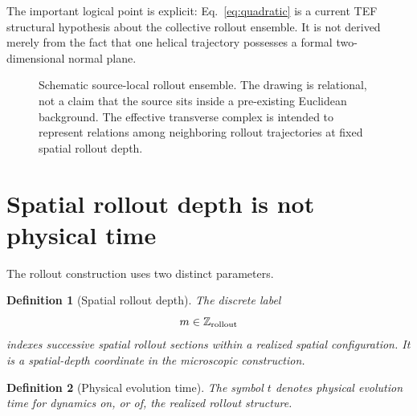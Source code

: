 \documentclass[11pt]{article}
\newtheorem{definition}{Definition}
\newcommand{\Z}{\mathbb{Z}}
\begin{document}
The important logical point is explicit: Eq.~\eqref{eq:quadratic} is a current TEF structural hypothesis about the collective rollout ensemble. It is not derived merely from the fact that one helical trajectory possesses a formal two-dimensional normal plane.

\begin{figure}[t]
\centering
{}
\caption{Schematic source-local rollout ensemble. The drawing is relational, not a claim that the source sits inside a pre-existing Euclidean background. The effective transverse complex is intended to represent relations among neighboring rollout trajectories at fixed spatial rollout depth.}
\label{fig:ensemble}
\end{figure}

\section{Spatial rollout depth is not physical time}

The rollout construction uses two distinct parameters.

\begin{definition}[Spatial rollout depth]
The discrete label
\[
m\in\Z_{\rm rollout}
\]
indexes successive spatial rollout sections within a realized spatial configuration. It is a spatial-depth coordinate in the microscopic construction.
\end{definition}

\begin{definition}[Physical evolution time]
The symbol \(t\) denotes physical evolution time for dynamics on, or of, the realized rollout structure.
\end{definition}
\end{document}
